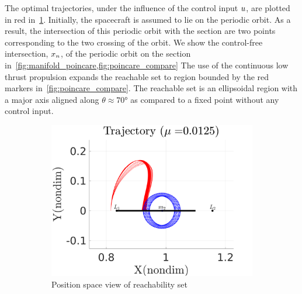 The optimal trajectories, under the influence of the control input \( u \), are plotted in red in~\cref{fig:reach_trajectory}.
Initially, the spacecraft is assumed to lie on the periodic orbit.
As a result, the intersection of this periodic orbit with the \Poincare section are two points corresponding to the two crossing of the orbit.
We show the control-free intersection, \( x_n \), of the periodic orbit on the \Poincare section in~\cref{fig:manifold_poincare,fig:poincare_compare}
The use of the continuous low thrust propulsion expands the reachable set to region bounded by the red markers in~\cref{fig:poincare_compare}.
The reachable set is an ellipsoidal region with a major axis aligned along \( \theta \approx \ang{70} \) as compared to a fixed point without any control input.
\begin{figure} 
        \centering 
        \begin{subfigure}[htbp]{0.5\textwidth} 
            \includegraphics[width=\textwidth]{figures/2017_JAS/reach_trajectory} 
                \caption{Position space view of reachability set} \label{fig:reach_trajectory} 
        \end{subfigure}~ %
        \begin{subfigure}[htbp]{0.5\textwidth} 

\end{subfigure}
\end{figure}
